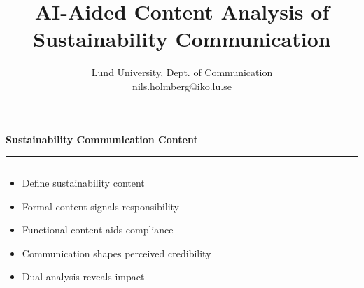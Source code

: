\documentclass[aspectratio=169]{beamer}
\title{AI-Aided Content Analysis of Sustainability Communication}
\subtitle{Lund University, Dept. of Communication \\[0.8em]nils.holmberg@iko.lu.se}
\author{}
\newcommand{\TitleFont}{\rmfamily}
\begin{document}
\begin{frame}[plain]
  \titlepage
\end{frame}
\setcounter{framenumber}{0} %

\begin{frame}[t]{}
  \vspace*{0.5cm}
  {\TitleFont\fontsize{16}{20}\selectfont\bfseries\color{LUBronze}Sustainability Communication Content\par}
  \vspace{0.3em}
  {\color{LUBronze}\rule{\linewidth}{0.8pt}}\par
  \vspace{0.2cm}
  \begin{columns}[t]
    \begin{column}[t]{0.45\textwidth}
      \vspace*{0pt}
      \begin{itemize}\setlength\itemsep{0.65em}
        \item Define sustainability content
        \item Formal content signals responsibility
        \item Functional content aids compliance
        \item Communication shapes perceived credibility
        \item Dual analysis reveals impact
      \end{itemize}
    \end{column}
  \end{columns}
\end{frame}
\end{document}
